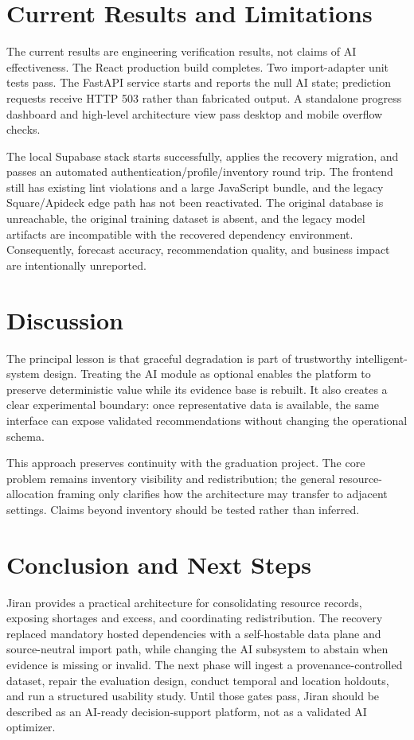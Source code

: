 \documentclass[graybox]{svmult}
\begin{document}
\section{Current Results and Limitations}
The current results are engineering verification results, not claims of AI effectiveness. The React production build completes. Two import-adapter unit tests pass. The FastAPI service starts and reports the null AI state; prediction requests receive HTTP 503 rather than fabricated output. A standalone progress dashboard and high-level architecture view pass desktop and mobile overflow checks.

The local Supabase stack starts successfully, applies the recovery migration, and passes an automated authentication/profile/inventory round trip. The frontend still has existing lint violations and a large JavaScript bundle, and the legacy Square/Apideck edge path has not been reactivated. The original database is unreachable, the original training dataset is absent, and the legacy model artifacts are incompatible with the recovered dependency environment. Consequently, forecast accuracy, recommendation quality, and business impact are intentionally unreported.

\section{Discussion}
The principal lesson is that graceful degradation is part of trustworthy intelligent-system design. Treating the AI module as optional enables the platform to preserve deterministic value while its evidence base is rebuilt. It also creates a clear experimental boundary: once representative data is available, the same interface can expose validated recommendations without changing the operational schema.

This approach preserves continuity with the graduation project. The core problem remains inventory visibility and redistribution; the general resource-allocation framing only clarifies how the architecture may transfer to adjacent settings. Claims beyond inventory should be tested rather than inferred.

\section{Conclusion and Next Steps}
Jiran provides a practical architecture for consolidating resource records, exposing shortages and excess, and coordinating redistribution. The recovery replaced mandatory hosted dependencies with a self-hostable data plane and source-neutral import path, while changing the AI subsystem to abstain when evidence is missing or invalid. The next phase will ingest a provenance-controlled dataset, repair the evaluation design, conduct temporal and location holdouts, and run a structured usability study. Until those gates pass, Jiran should be described as an AI-ready decision-support platform, not as a validated AI optimizer.
\end{document}
